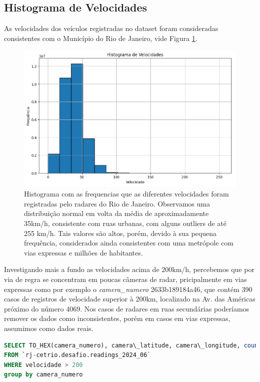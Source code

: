 \documentclass{article}
\begin{document}
\subsection{Histograma de Velocidades}

As velocidades dos veículos registradas no dataset foram consideradas consistentes com o Município do Rio de Janeiro, vide Figura \ref{fig:histVelocidades}.

\begin{figure}
    \centering
    \includegraphics[width=0.75\linewidth]{histVelocidades.png}
    \caption{Histograma com as frequencias que as diferentes velocidades foram registradas pelo radares do Rio de Janeiro. Observamos uma distribuição normal em volta da média de aproximadamente 35km/h, consistente com ruas urbanas, com alguns outliers de até 255 km/h. Tais valores são altos, porém, devido à sua pequena frequência, considerados ainda consistentes com uma metrópole com vias expressas e milhões de habitantes.}
    \label{fig:histVelocidades}
\end{figure}

Investigando mais a fundo as velocidades acima de 200km/h, percebemos que por via de regra se concentram em poucas câmeras de radar, pricipalmente em vias expressas como por exemplo o \textit{camera\_numero} 2633b189184a46, que contém 390 casos de registros de velocidade superior à 200km, localizado na Av. das Américas próximo do número 4069. Nos casos de radares em ruas secundárias poderíamos remover os dados como inconsistentes, porém em casos em vias expressas, assumimos como dados reais.

\begin{lstlisting}[language=SQL,caption={Query SQL para identificar quais as câmeras de radares mais capturam veículos em velocidades superiores à 200km/h, a fim de investigar suas latitudes e longitudes, e assim determinar se o registro é potencialmente válido, ou não.},label={lst:sqlquery10}]
SELECT TO_HEX(camera_numero), camera\_latitude, camera\_longitude, count(*)
FROM `rj-cetrio.desafio.readings_2024_06`
WHERE velocidade > 200
group by camera_numero
\end{lstlisting}
\end{document}
